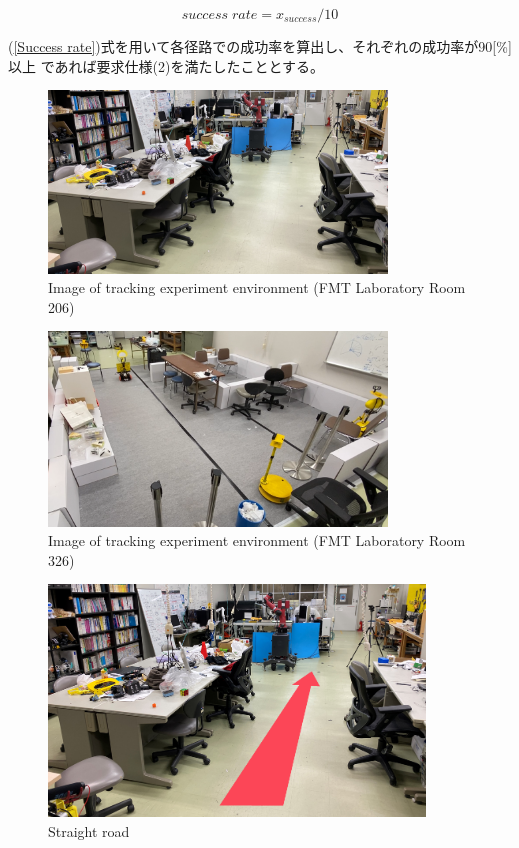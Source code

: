 \begin{equation}
\label{Success rate}
  success \; rate = x_{success} / 10
\end{equation}

(\ref{Success rate})式を用いて各径路での成功率を算出し、それぞれの成功率が90[\%]以上
であれば要求仕様(2)を満たしたこととする。

\begin{figure}[h]
  \begin{center}
  \includegraphics[width=90mm,clip]{figure/experimental_env1.JPG}
  \caption{Image of tracking experiment environment (FMT Laboratory Room 206)}
  \label{Image of tracking experiment environment (FMT Laboratory Room 206)}
  \end{center}
\end{figure}

\begin{figure}[h]
  \begin{center}
  \includegraphics[width=90mm,clip]{figure/experimental_env2.png}
  \caption{Image of tracking experiment environment (FMT Laboratory Room 326)}
  \label{Image of tracking experiment environment (FMT Laboratory Room 326)}
  \end{center}
\end{figure}

\begin{figure}[h]
  \begin{center}
  \includegraphics[width=100mm,clip]{figure/Straight.PNG}
  \caption{Straight road}
  \label{Straight road}
  \end{center}
\end{figure}

